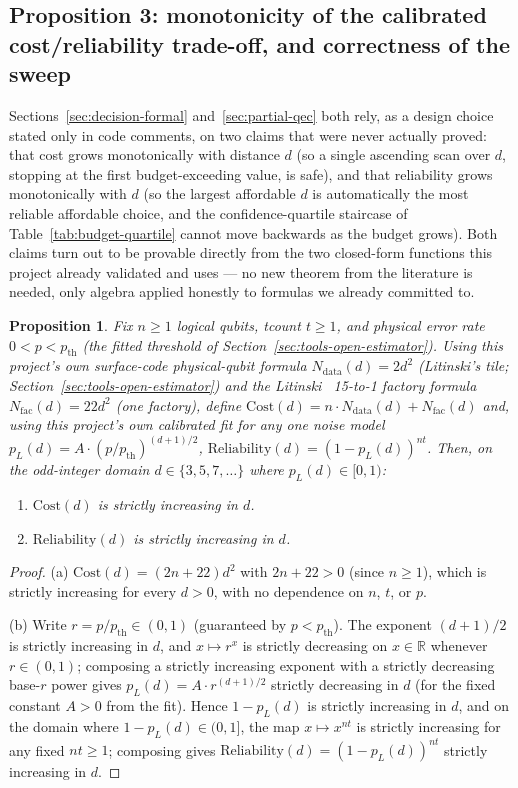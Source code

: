 \documentclass[9pt,twocolumn]{extarticle}
\newtheorem{proposition}{Proposition}
\begin{document}
\subsection{Proposition 3: monotonicity of the calibrated cost/reliability trade-off, and correctness of the sweep}
\label{sec:prop3}
Sections~\ref{sec:decision-formal} and~\ref{sec:partial-qec} both rely, as
a design choice stated only in code comments, on two claims that were
never actually proved: that cost grows monotonically with distance $d$
(so a single ascending scan over $d$, stopping at the first budget-exceeding
value, is safe), and that reliability grows monotonically with $d$ (so the
largest affordable $d$ is automatically the most reliable affordable
choice, and the confidence-quartile staircase of
Table~\ref{tab:budget-quartile} cannot move backwards as the budget grows).
Both claims turn out to be provable directly from the two closed-form
functions this project already validated and uses --- no new theorem from
the literature is needed, only algebra applied honestly to formulas we
already committed to.

\begin{proposition}
Fix $n\geq 1$ logical qubits, tcount $t\geq 1$, and physical error rate
$0<p<p_{\mathrm{th}}$ (the fitted threshold of
Section~\ref{sec:tools-open-estimator}). Using this project's own
surface-code physical-qubit formula
$N_{\mathrm{data}}(d)=2d^2$ (Litinski's tile; Section~\ref{sec:tools-open-estimator}) and the Litinski~\cite{litinski2019game}
15-to-1 factory formula $N_{\mathrm{fac}}(d)=22d^2$ (one factory), define
$\mathrm{Cost}(d) = n\cdot N_{\mathrm{data}}(d) + N_{\mathrm{fac}}(d)$ and,
using this project's own calibrated fit for any one noise model
$p_L(d)=A\cdot(p/p_{\mathrm{th}})^{(d+1)/2}$,
$\mathrm{Reliability}(d) = (1-p_L(d))^{nt}$. Then, on the odd-integer domain
$d\in\{3,5,7,\ldots\}$ where $p_L(d)\in[0,1)$:
\begin{enumerate}
\item[(a)] $\mathrm{Cost}(d)$ is strictly increasing in $d$.
\item[(b)] $\mathrm{Reliability}(d)$ is strictly increasing in $d$.
\end{enumerate}
\end{proposition}

\begin{proof}
(a) $\mathrm{Cost}(d) = (2n+22)d^2$ with $2n+22>0$ (since $n\geq1$), which
is strictly increasing for every $d>0$, with no dependence on $n$, $t$, or $p$.

(b) Write $r=p/p_{\mathrm{th}}\in(0,1)$ (guaranteed by $p<p_{\mathrm{th}}$).
The exponent $(d+1)/2$ is strictly increasing in $d$, and $x\mapsto r^x$ is
strictly decreasing on $x\in\mathbb{R}$ whenever $r\in(0,1)$; composing a
strictly increasing exponent with a strictly decreasing base-$r$ power
gives $p_L(d)=A\cdot r^{(d+1)/2}$ strictly decreasing in $d$ (for the fixed
constant $A>0$ from the fit). Hence $1-p_L(d)$ is strictly increasing in
$d$, and on the domain where $1-p_L(d)\in(0,1]$, the map
$x\mapsto x^{nt}$ is strictly increasing for any fixed $nt\geq 1$; composing
gives $\mathrm{Reliability}(d)=(1-p_L(d))^{nt}$ strictly increasing in $d$.
\end{proof}
\end{document}
